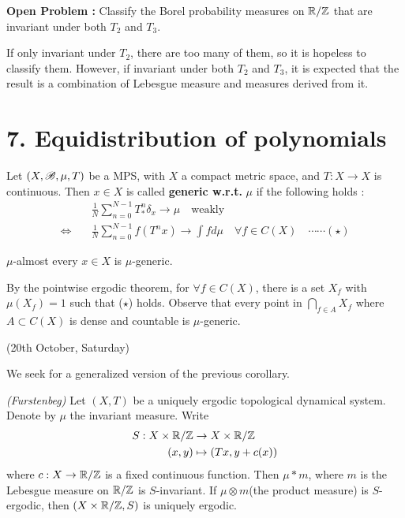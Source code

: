 \documentclass[12pt,a4paper]{report}
\newenvironment{proof}
{\begin{changemargin}{1cm}{0.5cm} 
	}%
	{\end{changemargin}
}
\begin{document}
\textbf{Open Problem : }Classify the Borel probability measures on $\mathbb{R}/\mathbb{Z}$ that are invariant under both $T_2$ and $T_3$.

\quad If only invariant under $T_2$, there are too many of them, so it is hopeless to classify them. However, if invariant under both $T_2$ and $T_3$, it is expected that the result is a combination of Lebesgue measure and measures derived from it.
\s

\section*{7. Equidistribution of polynomials}

 Let $(X,\mathscr{B}, \mu, T)$ be a MPS, with $X$ a compact metric space, and $T:X \rightarrow X$ is continuous. Then $x\in X$ is called \textbf{generic w.r.t. } $\mu$ if the following holds :
\begin{align*}
& \frac{1}{N}\sum_{n=0}^{N-1} T^n_* \delta_x \rightarrow \mu \quad \text{weakly} \\
\Leftrightarrow \quad & \frac{1}{N} \sum_{n=0}^{N-1} f(T^n x) \rightarrow \int f d\mu \quad \forall f \in C(X) \quad \cdots\cdots (\star)
\end{align*}
\s

\lem $\mu$-almost every $x\in X$ is $\mu$-generic.
\begin{proof}
\pf By the pointwise ergodic theorem, for $\forall f \in C(X)$, there is a set $X_f$ with $\mu(X_f) =1$ such that ($\star$) holds. Observe that every point in $\bigcap_{f\in A} X_f$ where $A\subset C(X)$ is dense and countable is $\mu$-generic.

\eop
\end{proof}
\s

\newday

(20th October, Saturday)
\s

We seek for a generalized version of the previous corollary.
\s

\thm \emph{(Furstenbeg)} Let $(X,T)$ be a uniquely ergodic topological dynamical system. Denote by $\mu$ the invariant measure. Write
\begin{align*}
S: X \times \mathbb{R}/\mathbb{Z} &\rightarrow X \times \mathbb{R}/\mathbb{Z} \\
(x,y) &\mapsto (Tx, y+c(x))
\end{align*}
where $c:X\rightarrow \mathbb{R}/\mathbb{Z}$ is a fixed continuous function. Then $\mu * m$, where $m$ is the Lebesgue measure on $\mathbb{R}/\mathbb{Z}$ is $S$-invariant. If $\mu \otimes m$(the product measure) is $S$-ergodic, then $(X\times \mathbb{R}/\mathbb{Z},S)$ is uniquely ergodic.
\s
\end{document}

